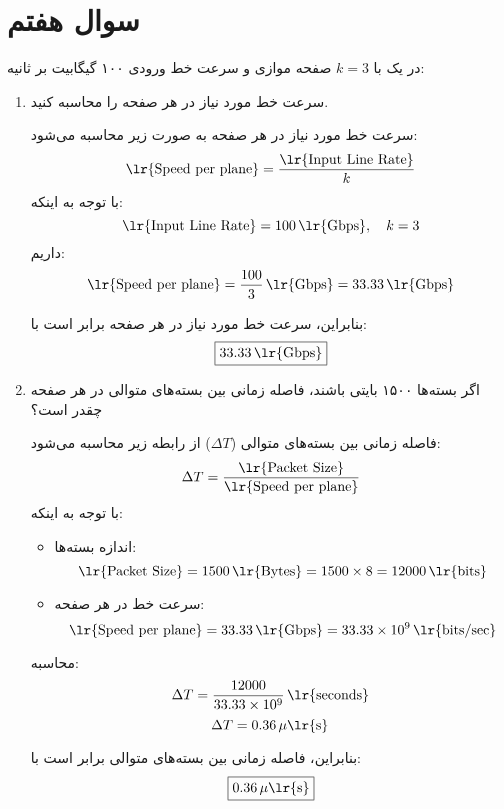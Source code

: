 \section{سوال هفتم}

در یک  با $k=3 $ صفحه موازی و سرعت خط ورودی ۱۰۰ گیگابیت بر ثانیه:

\begin{enumerate}
	\item 
	سرعت خط مورد نیاز در هر صفحه را محاسبه کنید.
	
	\begin{qsolve}
		
		سرعت خط مورد نیاز در هر صفحه به صورت زیر محاسبه می‌شود:
		\[
		\text{\lr{Speed per plane}} = \frac{\text{\lr{Input Line Rate}}}{k}
		\]
		با توجه به اینکه:
		\[
		\text{\lr{Input Line Rate}} = 100 \, \text{\lr{Gbps}}, \quad k = 3
		\]
		داریم:
		\[
		\text{\lr{Speed per plane}} = \frac{100}{3} \, \text{\lr{Gbps}} = 33.33 \, \text{\lr{Gbps}}
		\]
		
		بنابراین، سرعت خط مورد نیاز در هر صفحه برابر است با:
		\[
		\boxed{33.33 \, \text{\lr{Gbps}}}
		\]
	\end{qsolve}
	
	\item 
	اگر بسته‌ها ۱۵۰۰ بایتی باشند، فاصله زمانی بین بسته‌های متوالی در هر صفحه چقدر است؟
	\begin{qsolve}
		
		فاصله زمانی بین بسته‌های متوالی (\(\Delta T\)) از رابطه زیر محاسبه می‌شود:
		\[
		\Delta T = \frac{\text{\lr{Packet Size}}}{\text{\lr{Speed per plane}}}
		\]
		با توجه به اینکه:
		\begin{itemize}
			\item اندازه بسته‌ها: 
			\[
			\text{\lr{Packet Size}} = 1500 \, \text{\lr{Bytes}} = 1500 \times 8 = 12000 \, \text{\lr{bits}}
			\]
			\item سرعت خط در هر صفحه: 
			\[
			\text{\lr{Speed per plane}} = 33.33 \, \text{\lr{Gbps}} = 33.33 \times 10^9 \, \text{\lr{bits/sec}}
			\]
		\end{itemize}
		محاسبه:
		\[
		\Delta T = \frac{12000}{33.33 \times 10^9} \, \text{\lr{seconds}}
		\]
		\[
		\Delta T = 0.36 \, \mu\text{\lr{s}}
		\]
		
		بنابراین، فاصله زمانی بین بسته‌های متوالی برابر است با:
		\[
		\boxed{0.36 \, \mu\text{\lr{s}}}
		\]
	\end{qsolve}
\end{enumerate}